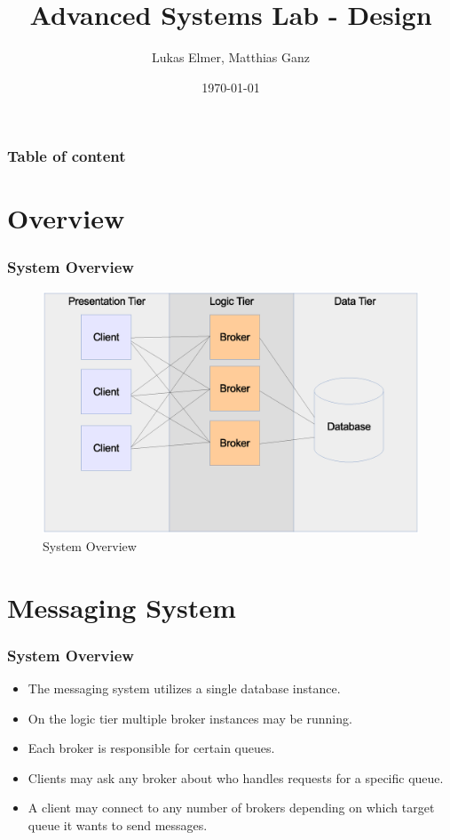 \documentclass{beamer}
\title{Advanced Systems Lab - Design}
\author{Lukas Elmer, Matthias Ganz}
\date{\today}
\begin{document}
\begin{frame}
\titlepage
\end{frame} 

\begin{frame}
\frametitle{Table of content}
\tableofcontents
\end{frame} 



\section{Overview}
\begin{frame}
\frametitle{System Overview}

\begin{figure}
  \begin{center}
  
    \includegraphics[scale=0.3]{../../drawings/system-overview.eps}
    
  \end{center}
  \caption{System Overview}
  \label{fig:system-overview}
\end{figure}


\end{frame}

\section{Messaging System}

\begin{frame}
\frametitle{System Overview}
\begin{itemize}
\item The messaging system utilizes a single database instance. 
\item On the logic tier multiple broker instances may be running. 
\item Each broker is responsible for certain queues.
\item Clients may ask any broker about who handles requests for a specific queue.
\item A client may connect to any number of brokers depending on which target queue it wants to send messages.
\end{itemize}
\end{frame}
\end{document}
